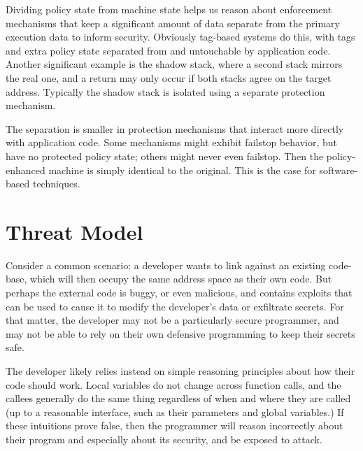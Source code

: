 \documentclass[acmsmall,review,anonymous]{acmart}\settopmatter{printfolios=true,printccs=false,printacmref=false}
\begin{document}
%
Dividing policy state from machine state helps us reason about
enforcement mechanisms that keep a significant amount of data separate from the
primary execution data to inform security. Obviously tag-based systems do this,
with tags and extra policy state separated from and untouchable by application code.
Another significant example is the shadow stack, where a second stack
mirrors the real one, and a return may only occur if both stacks agree on the
target address. Typically the shadow stack is isolated using a separate protection
mechanism.

The separation is smaller in protection mechanisms that interact more directly
with application code. Some mechanisms might exhibit failstop behavior, but have
no protected policy state; others might never even failstop. Then the policy-enhanced
machine is simply identical to the original. This is the case for software-based
techniques.

\section{Threat Model}
\label{sec:threat}

Consider a common scenario: a developer wants to link against an existing
code-base, which will then occupy the same address space as their own code.
But perhaps the external code is buggy, or even malicious, and contains
exploits that can be used to cause it to modify the developer's data or
exfiltrate secrets. For that matter, the developer may not be a particularly
secure programmer, and may not be able to rely on their own defensive programming
to keep their secrets safe.

The developer likely relies instead on simple reasoning principles about how
their code should work. Local variables do not change across function calls,
and the callees generally do the same thing regardless of when and where they
are called (up to a reasonable interface, such as their parameters and global
variables.) If these intuitions prove false, then the programmer will reason
incorrectly about their program and especially about its security, and
be exposed to attack.
\end{document}

